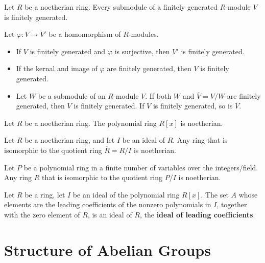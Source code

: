 \documentclass{memoir}
\begin{document}
\begin{thm}
	Let \(R\) be a noetherian ring. Every submodule of a finitely generated \(R\)-module \(V\) is finitely generated.
\end{thm}
\begin{lemma}
	Let \(\varphi:V\to V'\) be a homomorphism of \(R\)-modules.
	\begin{itemize}
		\item If \(V\) is finitely generated and \(\varphi\) is surjective, then \(V'\) is finitely generated.
		\item If the kernal and image of \(\varphi\) are finitely generated, then \(V\) is finitely generated.
		\item Let \(W\) be a submodule of an \(R\)-module \(V\). If both \(W\) and \(\overline{V} = V / W\) are finitely generated, then \(V\) is finitely generated. If \(V\) is finitely generated, so is \(\overline{V}\).
	\end{itemize}
\end{lemma}

\begin{thm}
	Let \(R\) be a noetherian ring. The polynomial ring \(R[x]\) is noetherian.
\end{thm}

\begin{prop}
	Let \(R\) be a noetherian ring, and let \(I\) be an ideal of \(R\). Any ring that is isomorphic to the quotient ring \(\overline{R} = R / I\) is noetherian.
\end{prop}
\begin{cor}
	Let \(P\) be a polynomial ring in a finite number of variables over the integers/field. Any ring \(R\) that is isomorphic to the quotient ring \(P / I\) is noetherian.
\end{cor}
\begin{lemma}
	Let \(R\) be a ring, let \(I\) be an ideal of the polynomial ring \(R[x]\). The set \(A\) whose elements are the leading coefficients of the nonzero polynomials in \(I\), together with the zero element of \(R\), is an ideal of \(R\), the \textbf{ideal of leading coefficients}.
\end{lemma}

\section{Structure of Abelian Groups}
\label{sec:structure_of_abelian_groups}
\end{document}

